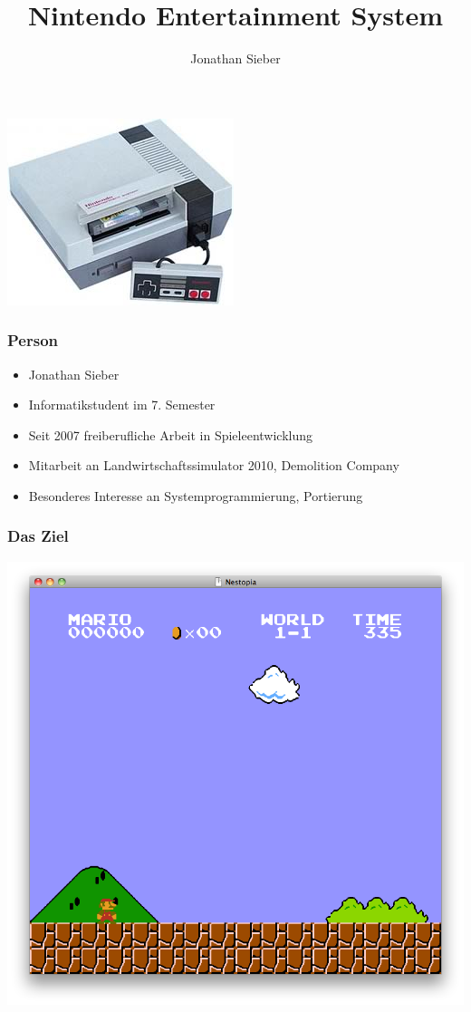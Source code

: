 \documentclass{beamer}
\title{Nintendo Entertainment System}
\author{Jonathan Sieber}
\begin{document}
    \begin{frame}
        \maketitle
        \begin{center}
            \includegraphics[height=0.4\textheight]{img/nes.jpg}
        \end{center}
    \end{frame}
    
    \begin{frame}
    \frametitle{Person}
    \begin{itemize}
        \item{Jonathan Sieber}
        \item{Informatikstudent im 7. Semester}
        \item{Seit 2007 freiberufliche Arbeit in Spieleentwicklung}
        \item{Mitarbeit an Landwirtschaftssimulator 2010, Demolition Company}
        \item{Besonderes Interesse an Systemprogrammierung, Portierung}
    \end{itemize}
    \end{frame}
    
    
    \begin{frame}
        \frametitle{Das Ziel}
        \includegraphics[width=0.8\linewidth]{img/smb.png}
    \end{frame}
    
\end{document}
